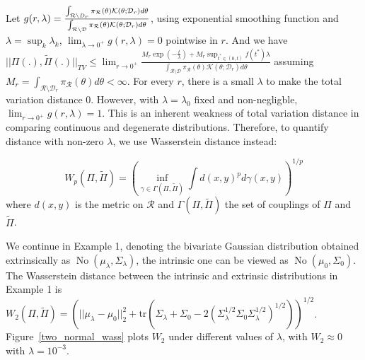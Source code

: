 \documentclass[10pt]{article}
\newcommand{\mc}[1]{\mathcal{#1}}
\DeclareMathOperator{\No}{No}
\DeclareMathOperator{\1}{\mathbbm{1}}
\begin{document}
 Let $g(r,\lambda)=
\frac{\int_{\mc R \setminus \mc \mc D_r} \pi_{\mc R}(\theta) \mc K(\theta;\mc D_r)d\theta}{\int_{\mc R \setminus \mc D} \pi_{\mc R}(\theta) \mc K(\theta;\mc D_r)d\theta}$, using exponential smoothing function and $\lambda = \sup_k\lambda_k$, $\lim_{\lambda\rightarrow 0^+}g(r,\lambda)=0$ pointwise in $r$. And we have  $||\Pi(.), \tilde{\Pi}(.) ||_{TV}\le \lim_{r\rightarrow 0^+}\frac{{M_r} \exp(-\frac{t}{\lambda}) + {M_r} \sup_{t^*\in(0,t)} {f(t^*)}\lambda }{\int_{\mc R  \setminus \mc D} \pi_{\mc R}(\theta) \mc K(\theta;\mc D_{r})d\theta}$ assuming $M_r= \int_{\mc R \setminus \mc D_{r}} \pi_{\mc R }(\theta) d\theta<\infty$. For every $r$, there is a small $\lambda$ to make the total variation distance  $0$. However, with $\lambda=\lambda_0$ fixed and non-negligble, $\lim_{r\rightarrow 0^+}g(r,\lambda)=1$. This is an inherent weakness of total variation distance in comparing continuous and degenerate distributions. Therefore, to quantify distance with non-zero $\lambda$, we use Wasserstein distance instead:

$$W_p(\Pi,\tilde\Pi)=\left(\underset{\gamma\in \Gamma(\Pi,\tilde\Pi)}{\inf}\int d(x,y)^p d\gamma(x,y)\right)^{1/p}$$
 where $ d(x,y)$ is the metric on $\mc R$ and $\Gamma(\Pi,\tilde\Pi)$ the set of couplings of $\Pi$ and $\tilde\Pi$.

We continue in Example 1, denoting the bivariate Gaussian distribution obtained extrinsically as $\No(\mu_\lambda, \Sigma_\lambda)$, the intrinsic one can be viewed as $\No(\mu_0, \Sigma_0)$. The Wasserstein distance between the intrinsic and extrinsic distributions in Example 1 \citep{dowson1982frechet} is $W_2 (\Pi,\tilde\Pi)= \left( ||\mu_\lambda - \mu_0||_2^2+ \text{tr}(\Sigma_\lambda+\Sigma_0- 2 (\Sigma_\lambda^{1/2}  \Sigma_0 \Sigma_\lambda^{1/2})^{1/2}) \right)^{1/2} $. Figure~\ref{two_normal_wass} plots $W_2$ under different values of $\lambda$, with $W_2\approx 0$ with $\lambda=10^{-3}$.
\end{document}
